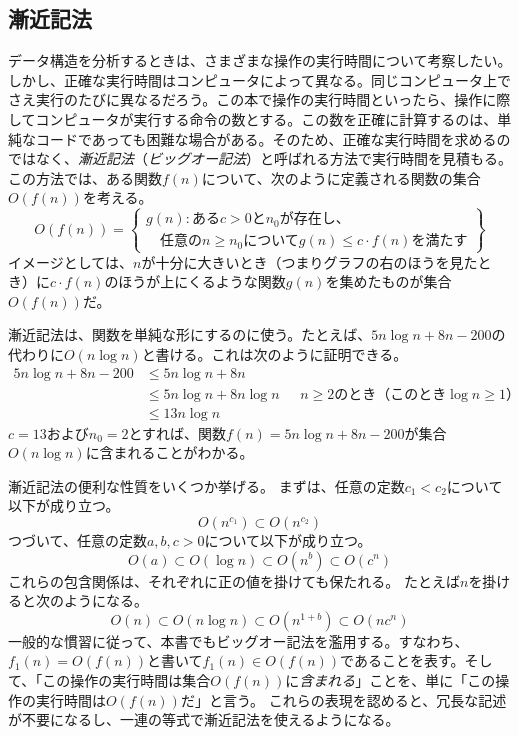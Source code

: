 \subsection{漸近記法}

  
データ構造を分析するときは、さまざまな操作の実行時間について考察したい。しかし、正確な実行時間はコンピュータによって異なる。同じコンピュータ上でさえ実行のたびに異なるだろう。この本で操作の実行時間といったら、操作に際してコンピュータが実行する命令の数とする。この数を正確に計算するのは、単純なコードであっても困難な場合がある。そのため、正確な実行時間を求めるのではなく、\emph{漸近記法}（\emph{ビッグオー記法}）と呼ばれる方法で実行時間を見積もる。この方法では、ある関数$f(n)$について、次のように定義される関数の集合$O(f(n))$を考える。%
\[
   O(f(n)) = \left\{
     \begin{array}{l}
       g(n):\mbox{ある$c>0$と$n_0$が存在し、} \\
             \quad\mbox{任意の$n\ge n_0$について$g(n) \le c\cdot f(n)$を満たす}
     \end{array} \right\}
\]
イメージとしては、$n$が十分に大きいとき（つまりグラフの右のほうを見たとき）に$c\cdot f(n)$のほうが上にくるような関数$g(n)$を集めたものが集合$O(f(n))$だ。 %

漸近記法は、関数を単純な形にするのに使う。たとえば、$5n\log n + 8n - 200$の代わりに$O(n \log n)$と書ける。これは次のように証明できる。
\begin{align*}
       5n\log n + 8n - 200
        & \le 5n\log n + 8n \\
        & \le 5n\log n + 8n\log n & \mbox{ $n\ge 2$のとき（このとき$\log n \ge 1$）}
            \\
        & \le 13n\log n
\end{align*}
$c = 13$および$n_0 = 2$とすれば、関数$f(n)= 5n \log n + 8n-200$が集合$O(n \log n)$に含まれることがわかる。

漸近記法の便利な性質をいくつか挙げる。
まずは、任意の定数$c_1 < c_2$について以下が成り立つ。
\[ O(n^{c_1}) \subset O(n^{c_2}) \]
つづいて、任意の定数$ a, b, c> 0 $について以下が成り立つ。
\[ O(a) \subset O(\log n) \subset O(n^{b}) \subset O({c}^n) \]
これらの包含関係は、それぞれに正の値を掛けても保たれる。
たとえば$n$を掛けると次のようになる。
\[ O(n) \subset O(n\log n) \subset O(n^{1+b}) \subset O(n{c}^n) \]
一般的な慣習に従って、本書でもビッグオー記法を濫用する。すなわち、$f_1(n) = O(f(n))$と書いて$f_1(n) \in O(f(n))$であることを表す。そして、「この操作の実行時間は集合$O(f(n))$に\emph{含まれる}」ことを、単に「この操作の実行時間は$O(f(n))$だ」と言う。
これらの表現を認めると、冗長な記述が不要になるし、一連の等式で漸近記法を使えるようになる。

